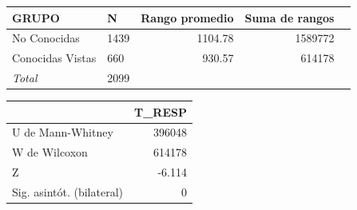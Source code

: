 \documentclass[10pt]{beamer}
\begin{document}
\begin{frame}
	\begin{table}
	  \begin{tabular}[t]{|l|l|r|r|r|}
	    \hline
		\textbf{GRUPO} & \textbf{N} & \textbf{Rango promedio} & \textbf{Suma de rangos} \\ \hline
		No Conocidas & 1439 & 1104.78 & 1589772 \\ \hline
		Conocidas Vistas & 660 & 930.57 & 614178 \\ \hline
		\textit{Total} & 2099 &   &   \\ \hline
	  \end{tabular}   \begin{tabular}[t]{|l|r|}
	    \hline
		& \textbf{T\_RESP} \\ \hline
	      U de Mann-Whitney & 396048 \\ \hline
	      W de Wilcoxon & 614178 \\ \hline
	      Z & -6.114 \\ \hline
	      Sig. asintót. (bilateral) & 0 \\ \hline
	  \end{tabular}
	\end{table}
      \end{frame}
\end{document}

